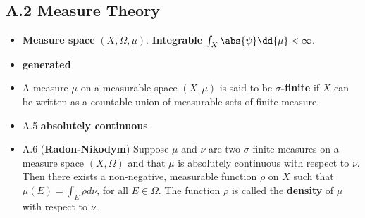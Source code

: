 
\subsection{A.2 Measure Theory}

\begin{itemize}
\item \textbf{Measure space} $(X,\Omega,\mu)$. \textbf{Integrable} $\int_X \abs{\psi} \dd{\mu} < \infty$.

\item \textbf{generated}

\item A measure $\mu$ on a measurable space $(X, \mu)$ is said to be \textbf{$\sigma$-finite} if $X$ can be written as a countable union of measurable sets of finite measure.

\item A.5 \textbf{absolutely continuous}

\item A.6 (\textbf{Radon-Nikodym}) Suppose $\mu$ and $\nu$ are two $\sigma$-finite measures on a measure space $(X, \Omega)$ and that $\mu$ is absolutely continuous with respect to $\nu$. Then there exists a non-negative, measurable function $\rho$ on $X$ such that $\mu(E)=\int_{E} \rho d \nu$, for all $E \in \Omega$. The function $\rho$ is called the \textbf{density} of $\mu$ with respect to $\nu$.
\end{itemize}


